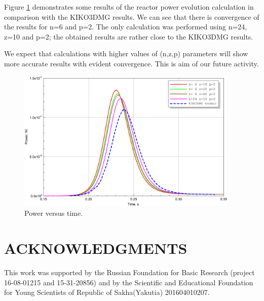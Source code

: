 \documentclass{aip-cp}
\begin{document}
Figure \ref{fig:4} demonstrates some results of the reactor power evolution calculation in comparison with the KIKO3DMG results. We can see that there is convergence of the results for n=6 and p=2. The only calculation was performed using n=24, z=10 and p=2; the obtained results are rather close to the KIKO3DMG results.

We expect that calculations with higher values of (n,z,p) parameters will show more accurate results with evident convergence. This is aim of our future activity.

\begin{figure}[!h]
  \centerline{\includegraphics[width=300pt]{power.png}}
  \caption{Power versus time.}
  \label{fig:4}
\end{figure}

\section{ACKNOWLEDGMENTS}
This work was supported by the Russian Foundation for Basic Research (project
16-08-01215 and 15-31-20856) and by the Scientific and Educational Foundation for Young Scientists of Republic of Sakha(Yakutia) 201604010207.


\nocite{*}
%
\end{document}
